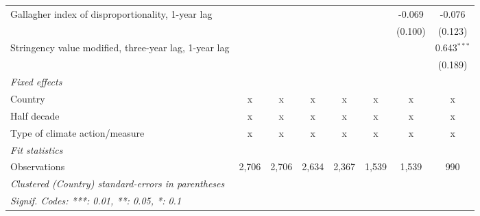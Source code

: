 \begin{table}[htbp]
\begin{tabular}{lccccccc}
      Gallagher index of disproportionality, 1-year lag     &         &         &             &              &              & -0.069       & -0.076\\   
                                                            &         &         &             &              &              & (0.100)      & (0.123)\\   
      Stringency value modified, three-year lag, 1-year lag &         &         &             &              &              &              & 0.643$^{***}$\\   
                                                            &         &         &             &              &              &              & (0.189)\\   
      \emph{Fixed effects}\\
      Country                                               & x       & x       & x           & x            & x            & x            & x\\  
      Half decade                                           & x       & x       & x           & x            & x            & x            & x\\  
      Type of climate action/measure                        & x       & x       & x           & x            & x            & x            & x\\  
      \midrule \emph{Fit statistics}\\
      Observations                                          & 2,706   & 2,706   & 2,634       & 2,367        & 1,539        & 1,539        & 990\\  
      \midrule
      \multicolumn{8}{l}{\emph{Clustered (Country) standard-errors in parentheses}}\\
      \multicolumn{8}{l}{\emph{Signif. Codes: ***: 0.01, **: 0.05, *: 0.1}}\\
   \end{tabular}
\end{table}


